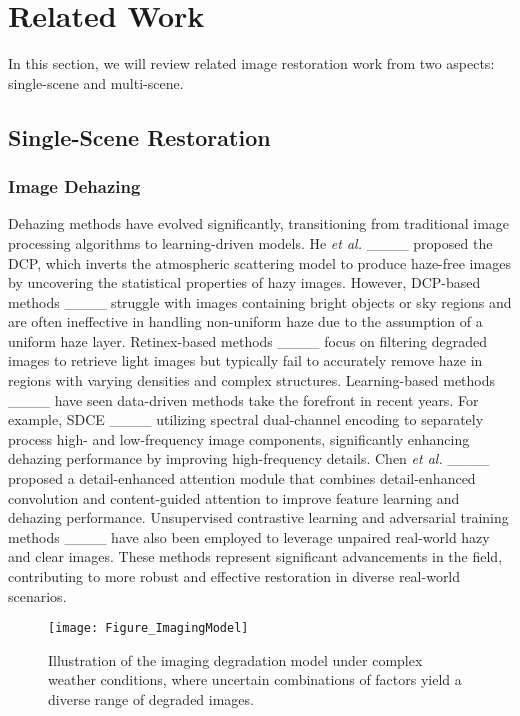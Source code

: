 \section{Related Work}
\label{sec:relatedwork}
%
    In this section, we will review related image restoration work from two aspects: single-scene and multi-scene.
%

\subsection{Single-Scene Restoration}
%
\subsubsection{Image Dehazing}
%
    Dehazing methods have evolved significantly, transitioning from traditional image processing algorithms to learning-driven models. He \textit{et al.} ____ proposed the DCP, which inverts the atmospheric scattering model to produce haze-free images by uncovering the statistical properties of hazy images. However, DCP-based methods ____ struggle with images containing bright objects or sky regions and are often ineffective in handling non-uniform haze due to the assumption of a uniform haze layer. Retinex-based methods ____ focus on filtering degraded images to retrieve light images but typically fail to accurately remove haze in regions with varying densities and complex structures. Learning-based methods ____ have seen data-driven methods take the forefront in recent years. For example, SDCE ____ utilizing spectral dual-channel encoding to separately process high- and low-frequency image components, significantly enhancing dehazing performance by improving high-frequency details. Chen \textit{et al.} ____ proposed a detail-enhanced attention module that combines detail-enhanced convolution and content-guided attention to improve feature learning and dehazing performance. Unsupervised contrastive learning and adversarial training methods ____ have also been employed to leverage unpaired real-world hazy and clear images. These methods represent significant advancements in the field, contributing to more robust and effective restoration in diverse real-world scenarios.
%
    \begin{figure}[t]
        \centering
        \setlength{\abovecaptionskip}{0.cm}
        \texttt{[image: Figure\_ImagingModel]}
        \caption{Illustration of the imaging degradation model under complex weather conditions, where uncertain combinations of factors yield a diverse range of degraded images.}
        \label{Figure_ImagingModel}
    \end{figure}
